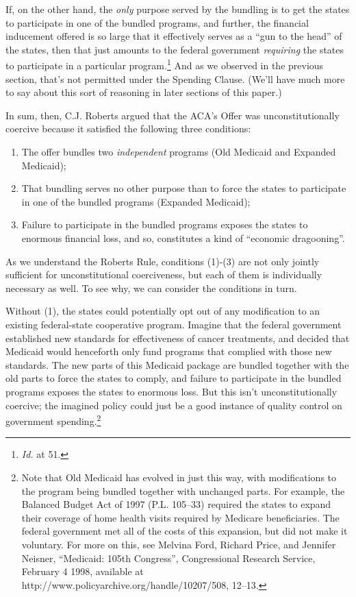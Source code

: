 If, on the other hand, the \emph{only} purpose served by the bundling is to get the states to participate in one of the bundled programs, and further, the financial inducement offered is so large that it effectively serves as a ``gun to the head'' of the states, then that just amounts to the federal government \emph{requiring} the states to participate in a particular program.\footnote{\emph{Id.} at 51.} And as we observed in the previous section, that's not permitted under the Spending Clause. (We'll have much more to say about this sort of reasoning in later sections of this paper.)

In sum, then, C.J. Roberts argued that the ACA's Offer was unconstitutionally coercive because it satisfied the following three conditions:

\begin{enumerate}
\item The offer bundles two \emph{independent} programs (Old Medicaid and Expanded Medicaid);

\item That bundling serves no other purpose than to force the states to participate in one of the bundled programs (Expanded Medicaid);

\item Failure to participate in the bundled programs exposes the states to enormous financial loss, and so, constitutes a kind of ``economic dragooning''.

\end{enumerate}
As we understand the Roberts Rule, conditions (1)-(3) are not only jointly sufficient for unconstitutional coerciveness, but each of them is individually necessary as well. To see why, we can consider the conditions in turn. 

Without (1), the states could potentially opt out of any modification to an existing federal-state cooperative program. Imagine that the federal government established new standards for effectiveness of cancer treatments, and decided that Medicaid would henceforth only fund programs that complied with those new standards. The new parts of this Medicaid package are bundled together with the old parts to force the states to comply, and failure to participate in the bundled programs exposes the states to enormous loss. But this isn't unconstitutionally coercive; the imagined policy could just be a good instance of quality control on government spending.\footnote{Note that Old Medicaid has evolved in just this way, with modifications to the program being bundled together with unchanged parts. For example, the Balanced Budget Act of 1997 (P.L. 105--33) required the states to expand their coverage of home health visits required by Medicare beneficiaries. The federal government met all of the costs of this expansion, but did not make it voluntary. For more on this, see Melvina Ford, Richard Price, and Jennifer Neisner, ``Medicaid: 105th Congress'', Congressional Research Service, February 4 1998, available at http:/\slash www.policyarchive.org\slash handle\slash 10207\slash 508, 12--13.}

